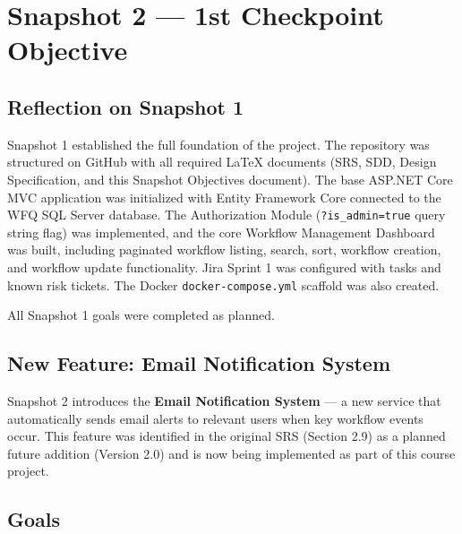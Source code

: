 \documentclass[12pt]{article}
\begin{document}
\section{Snapshot 2 — 1st Checkpoint Objective}

\subsection{Reflection on Snapshot 1}
Snapshot 1 established the full foundation of the project. The repository was structured on
GitHub with all required LaTeX documents (SRS, SDD, Design Specification, and this Snapshot
Objectives document). The base ASP.NET Core MVC application was initialized with Entity
Framework Core connected to the WFQ SQL Server database. The Authorization Module
(\texttt{?is\_admin=true} query string flag) was implemented, and the core Workflow
Management Dashboard was built, including paginated workflow listing, search, sort, workflow
creation, and workflow update functionality. Jira Sprint 1 was configured with tasks and
known risk tickets. The Docker \texttt{docker-compose.yml} scaffold was also created.

All Snapshot 1 goals were completed as planned.

\subsection{New Feature: Email Notification System}
Snapshot 2 introduces the \textbf{Email Notification System} --- a new service that
automatically sends email alerts to relevant users when key workflow events occur. This
feature was identified in the original SRS (Section 2.9) as a planned future addition
(Version 2.0) and is now being implemented as part of this course project.

\subsection{Goals}
\end{document}

